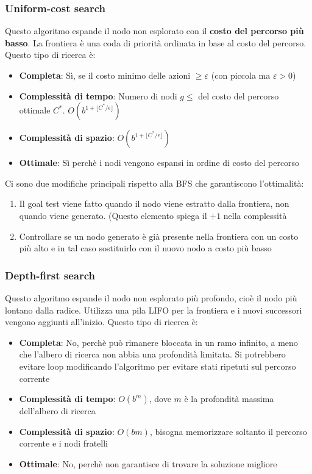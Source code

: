 \documentclass[a4paper]{article}
\begin{document}
\subsubsection{Uniform-cost search}
Questo algoritmo espande il nodo non esplorato con il \textbf{costo del percorso più basso}.
La frontiera è una coda di priorità ordinata in base al costo del percorso.
Questo tipo di ricerca è:
\begin{itemize}
  \item \textbf{Completa}: Sì, se il costo minimo delle azioni \( \ge \varepsilon \) 
    (con piccola ma \( \varepsilon > 0 \))
  \item \textbf{Complessità di tempo}: Numero di nodi \( g \le  \) del costo del percorso
    ottimale \( C^* \). \( O(b^{1+\lfloor C^*/\epsilon \rfloor}) \)
  \item \textbf{Complessità di spazio}: \( O(b^{1+\lfloor C^*/\epsilon \rfloor}) \)
  \item \textbf{Ottimale}: Sì perchè i nodi vengono espansi in ordine di costo del percorso
\end{itemize}
Ci sono due modifiche principali rispetto alla BFS che garantiscono l'ottimalità:
\begin{enumerate}
  \item Il goal test viene fatto quando il nodo viene estratto dalla frontiera, non quando
    viene generato. (Questo elemento spiega il \( +1 \) nella complessità
  \item Controllare se un nodo generato è già presente nella frontiera con un costo più
    alto e in tal caso sostituirlo con il nuovo nodo a costo più basso
\end{enumerate}

\subsubsection{Depth-first search}
Questo algoritmo espande il nodo non esplorato più profondo, cioè il nodo più lontano
dalla radice. Utilizza una pila LIFO per la frontiera e i nuovi successori vengono
aggiunti all'inizio.
Questo tipo di ricerca è:
\begin{itemize}
  \item \textbf{Completa}: No, perchè può rimanere bloccata in un ramo infinito,
    a meno che l'albero di ricerca non abbia una profondità limitata. Si potrebbero
    evitare loop modificando l'algoritmo per evitare stati ripetuti sul percorso corrente
  \item \textbf{Complessità di tempo}: \( O(b^m) \), dove \( m \) è la profondità massima
    dell'albero di ricerca
  \item \textbf{Complessità di spazio}: \( O(bm) \), bisogna memorizzare soltanto il
    percorso corrente e i nodi fratelli
  \item \textbf{Ottimale}: No, perchè non garantisce di trovare la soluzione migliore
\end{itemize}
\end{document}
